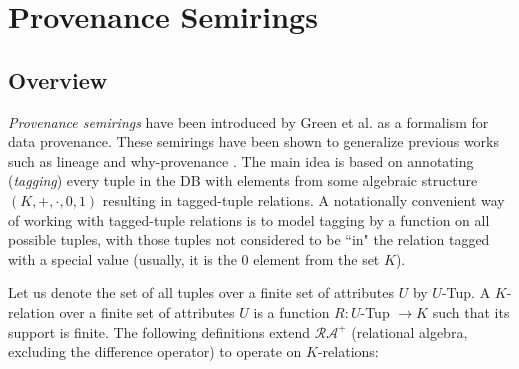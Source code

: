 \section{Provenance Semirings}\label{sec:semiring provenance}
\subsection{Overview}\footnotemark
{}
\textit{Provenance semirings} have been introduced by Green et al. \cite{green2007provenance} as a formalism for data provenance. These semirings have been shown \cite{Karvounarakis:2012:SDQ:2380776.2380778} to generalize previous works such as lineage \cite{Cui:2000:TLV:357775.357777} and why-provenance \cite{DBLP:conf/icdt/BunemanKT01}. The main idea is based on annotating (\textit{tagging}) every tuple in the DB with elements from some algebraic structure $(K,+,\cdot,0,1)$\footnotemark
{}
resulting in tagged-tuple relations.
A notationally convenient way of working with tagged-tuple relations is to model tagging by a function on all possible tuples, with those tuples not considered to be ``in" the relation tagged with a special value (usually, it is the $0$ element from the set $K$).
\par Let us denote the set of all tuples over a finite set of attributes $U$ by $U$-Tup.
A $K$-relation over a finite set of attributes $U$ is a function $R: U$-Tup $\rightarrow K$ such that its support\footnotemark\hspace{0.2mm} is finite.
The following definitions extend $\mathcal{RA^+}$ (relational algebra, excluding the difference operator) to operate on $K$-relations:
